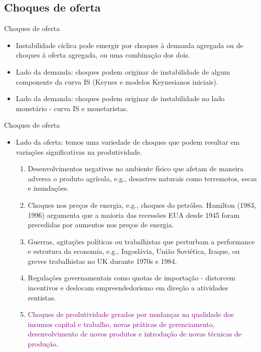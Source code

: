 \documentclass[10pt]{beamer}
\begin{document}
\subsection{Choques de oferta}
\begin{frame}{Choques de oferta}
    \begin{itemize}
        \item Instabilidade cíclica pode emergir por choques à demanda agregada ou de choques à oferta agregada, ou uma combinação dos dois.
        \bigskip
        \item Lado da demanda: choques podem originar de instabilidade de algum componente da curva IS (Keynes e modelos Keynesianos iniciais).
        \bigskip
        \item Lado da demanda: choques podem originar de instabilidade no lado monetário - curva IS e monetaristas.
    \end{itemize}
\end{frame}

\begin{frame}{Choques de oferta}
    \begin{itemize}
        \item Lado da oferta: temos uma variedade de choques que podem resultar em variações significativas na produtividade.
        \bigskip
        \begin{enumerate}
            \item Desenvolvimentos negativos no ambiente físico que afetam de maneira adversa o produto agrícola, e.g., desastres naturais como terremotos, secas e inundações.
            \bigskip
            \item Choques nos preços de energia, e.g., choques do petróleo. Hamilton (1983, 1996) argumenta que a maioria das recessões EUA desde 1945 foram precedidas por aumentos nos preços de energia.
            \bigskip
            \item Guerras, agitações políticas ou trabalhistas que perturbam a performance e estrutura da economia, e.g., Iugoslávia, União Soviética, Iraque, ou greves trabalhistas no UK durante 1970s e 1984.
            \bigskip
            \item Regulações governamentais como quotas de importação - distorcem incentivos e deslocam empreendedorismo em direção a atividades rentistas.
            \bigskip
            \item \textcolor{purple}{Choques de produtividade gerados por mudanças na qualidade dos insumos capital e trabalho, novas práticas de gerenciamento, desenvolvimento de novos produtos e introdução de novas técnicas de produção}.
        \end{enumerate}
    \end{itemize}
\end{frame}
\end{document}
